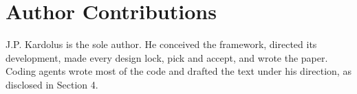 \section*{Author Contributions}\label{author-contributions}

J.P. Kardolus is the sole author. He conceived the framework, directed its development, made every design lock, pick and accept, and wrote the paper. Coding agents wrote most of the code and drafted the text under his direction, as disclosed in Section 4.
